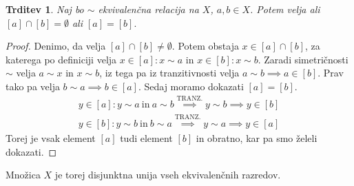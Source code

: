 \documentclass[10pt, a4paper]{article}
\newtheorem{trditev}[izr]{Trditev}
\newenvironment{noticeC}{%
  \tcolorbox[%
  notitle,
  empty,
  enhanced,  %
  breakable,
  coltext=black, 
  fontupper=\rmfamily,
  parbox=false,
  noparskip,
  sharp corners,
  boxrule=-1pt,  %
  frame hidden,
  left=7pt,  %
  right=7pt,
  top=5pt,
  bottom=5pt,
  before skip=2.5ex plus 2pt,
  after skip=2.5ex plus 2pt,
  overlay unbroken and last={%
  },
  ]}
{\endtcolorbox}
\newenvironment{dokaz}%
  {\begin{noticeC}\begin{proof}}%
  {\end{proof}\end{noticeC}}
\begin{document}
\begin{trditev}
    Naj bo $\sim$ ekvivalenčna relacija na $X$, $a,b \in X$. Potem velja ali
    $[a] \cap [b] = \emptyset$ ali $[a] = [b].$
\end{trditev}

\begin{dokaz}
    Denimo, da velja $[a] \cap [b] \neq \emptyset.$ 
    Potem obstaja $x \in [a] \cap [b]$, za katerega po definiciji velja $x \in [a]: x \sim a$ in $x \in [b]: x \sim b$.
    Zaradi simetričnosti $\sim$ velja $a \sim x$ in $x \sim b$, iz tega pa iz tranzitivnosti velja $a \sim b \implies a \in [b]$. Prav tako pa velja $b \sim a \implies b \in [a]$.
    Sedaj moramo dokazati $[a] = [b].$
    \begin{align*}
        y \in [a]: y \sim a\ \text{in}\ a \sim b \stackrel{\text{TRANZ.}}{\implies} y \sim b \implies y \in [b]\\
       y \in [b]: y \sim b\ \text{in}\ b \sim a \stackrel{\text{TRANZ.}}{\implies} y \sim a \implies y \in [a]
    \end{align*}
    Torej je vsak element $[a]$ tudi element $[b]$ in obratno, kar pa smo želeli dokazati.
\end{dokaz}

Množica $X$ je torej disjunktna unija vseh ekvivalenčnih razredov.
\end{document}
